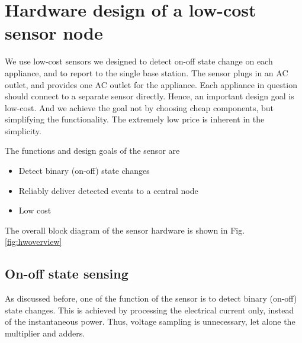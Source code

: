 \chapter{Hardware design of a low-cost sensor node}\label{chap3}

We use low-cost sensors we designed to detect on-off state change on each appliance, and to report to the single base station. The sensor plugs in an AC outlet, and provides one AC outlet for the appliance. Each appliance in question should connect to a separate sensor directly. Hence, an important design goal is low-cost. And we achieve the goal not by choosing cheap components, but simplifying the functionality. The extremely low price is inherent in the simplicity. 


The functions and design goals of the sensor are
\begin{itemize}
  \item Detect binary (on-off) state changes
  \item Reliably deliver detected events to a central node
  \item Low cost
\end{itemize}

The overall block diagram of the sensor hardware is shown in Fig. \ref{fig:hwoverview}


\section{On-off state sensing}

As discussed before, one of the function of the sensor is to detect binary (on-off) state changes. This is achieved by processing the electrical current only, instead of the instantaneous power. Thus, voltage sampling is unnecessary, let alone the multiplier and adders. 
